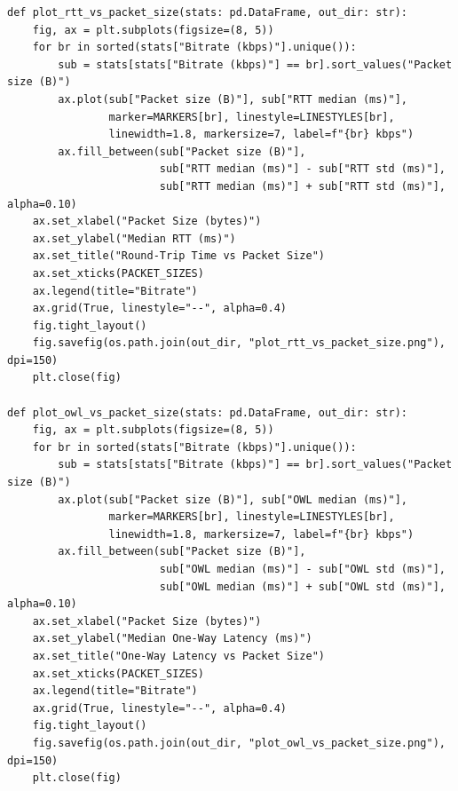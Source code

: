\begin{lstlisting}[style=appendix-py, caption={Latency vs.\ packet-size plotting}, label={lst:latency-pktsize-plot}]
def plot_rtt_vs_packet_size(stats: pd.DataFrame, out_dir: str):
    fig, ax = plt.subplots(figsize=(8, 5))
    for br in sorted(stats["Bitrate (kbps)"].unique()):
        sub = stats[stats["Bitrate (kbps)"] == br].sort_values("Packet size (B)")
        ax.plot(sub["Packet size (B)"], sub["RTT median (ms)"],
                marker=MARKERS[br], linestyle=LINESTYLES[br],
                linewidth=1.8, markersize=7, label=f"{br} kbps")
        ax.fill_between(sub["Packet size (B)"],
                        sub["RTT median (ms)"] - sub["RTT std (ms)"],
                        sub["RTT median (ms)"] + sub["RTT std (ms)"], alpha=0.10)
    ax.set_xlabel("Packet Size (bytes)")
    ax.set_ylabel("Median RTT (ms)")
    ax.set_title("Round-Trip Time vs Packet Size")
    ax.set_xticks(PACKET_SIZES)
    ax.legend(title="Bitrate")
    ax.grid(True, linestyle="--", alpha=0.4)
    fig.tight_layout()
    fig.savefig(os.path.join(out_dir, "plot_rtt_vs_packet_size.png"), dpi=150)
    plt.close(fig)

def plot_owl_vs_packet_size(stats: pd.DataFrame, out_dir: str):
    fig, ax = plt.subplots(figsize=(8, 5))
    for br in sorted(stats["Bitrate (kbps)"].unique()):
        sub = stats[stats["Bitrate (kbps)"] == br].sort_values("Packet size (B)")
        ax.plot(sub["Packet size (B)"], sub["OWL median (ms)"],
                marker=MARKERS[br], linestyle=LINESTYLES[br],
                linewidth=1.8, markersize=7, label=f"{br} kbps")
        ax.fill_between(sub["Packet size (B)"],
                        sub["OWL median (ms)"] - sub["OWL std (ms)"],
                        sub["OWL median (ms)"] + sub["OWL std (ms)"], alpha=0.10)
    ax.set_xlabel("Packet Size (bytes)")
    ax.set_ylabel("Median One-Way Latency (ms)")
    ax.set_title("One-Way Latency vs Packet Size")
    ax.set_xticks(PACKET_SIZES)
    ax.legend(title="Bitrate")
    ax.grid(True, linestyle="--", alpha=0.4)
    fig.tight_layout()
    fig.savefig(os.path.join(out_dir, "plot_owl_vs_packet_size.png"), dpi=150)
    plt.close(fig)


\end{lstlisting}
